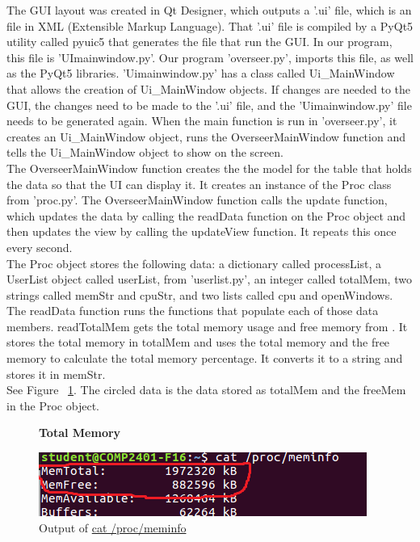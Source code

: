 \documentclass[12pt]{article}
\begin{document}
The GUI layout was created in Qt Designer, which outputs a '.ui' file, which is an file in XML (Extensible Markup Language).
That '.ui' file is compiled by a PyQt5 utility called pyuic5 that generates the file that run the GUI. In our program, this file is 'UImainwindow.py'. Our program  'overseer.py', imports this file, as well as the PyQt5 libraries. 
'Uimainwindow.py' has a class called Ui\_MainWindow that allows the creation of Ui\_MainWindow objects.
If changes are needed to the GUI, the changes need to be made to the '.ui' file, and the 'Uimainwindow.py' file needs to be generated again.
When the main function is run in 'overseer.py', it creates an Ui\_MainWindow object, runs the OverseerMainWindow function and tells the Ui\_MainWindow object to show on the screen.\\
The OverseerMainWindow function creates the the model for the table that holds the data so that the UI can display it.
It creates an instance of the Proc class from 'proc.py'.
The OverseerMainWindow function calls the update function, which updates the data by calling the readData function on the Proc object and then updates the view by calling the updateView function.
It repeats this once every second.\\
The Proc object stores the following data: a dictionary called processList, a UserList object called userList, from 'userlist.py', an integer called totalMem, two strings called memStr and cpuStr, and two lists called cpu and openWindows.\\
The readData function runs the functions that populate each of those data members.
readTotalMem gets the total memory usage and free memory from . It stores the total memory in totalMem and uses the total memory and the free memory to calculate the total memory percentage. It converts it to a string and stores it in memStr.\\
See Figure ~\ref{figTotalMem}.
The circled data is the data stored as totalMem and the freeMem in the Proc object.\\
\begin{figure}[h]
	\centering
	\textbf{Total Memory}\par\medskip
	\includegraphics{totalMem}
	\caption{Output of \url{cat /proc/meminfo}}
	\label{figTotalMem}
\end{figure}
\end{document}
